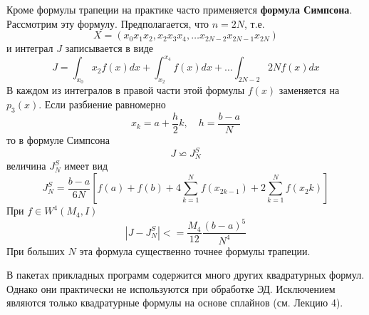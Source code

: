 Кроме формулы трапеции на практике часто применяется \textbf{формула Симпсона}. Рассмотрим эту формулу. Предполагается, что $n=2N$, т.е.
\begin{equation}
	X = (x_0 x_1 x_2, x_2 x_3 x_4, \dots x_{2N-2}x_{2N-1}x_{2N})
\end{equation}
и интеграл $J$ записывается в виде
\begin{equation}
	J=\int_{x_0}{x_2}f(x)dx + \int_{x_2}^{x_4}f(x)dx + \dots \int_{2N-2}{2N}f(x)dx
\end{equation}
В каждом из интегралов в правой части этой формулы $f(x)$ заменяется на $p_3(x)$. Если разбиение равномерно
\begin{equation}
	x_k = a + \frac{h}{2}k, \quad h=\frac{b-a}{N}
\end{equation}
то в формуле Симпсона
\begin{equation}
	J \backsimeq J_N^S
\end{equation}
величина $J_N^S$ имеет вид
\begin{equation}
	J_N^S = \frac{b-a}{6N}[f(a) + f(b) + 4\sum_{k=1}^{N}f(x_{2k-1}) + 2\sum_{k=1}^{N}f(x_2k)]
\end{equation}
При $f \in W^4(M_4,I)$
\begin{equation}
	|J-J^S_N| <= \frac{M_4}{12}\frac{(b-a)^5}{N^4}
\end{equation}
При больших $N$ эта формула существенно точнее формулы трапеции.

В пакетах прикладных программ содержится много других квадратурных формул. Однако они практически не используются при обработке ЭД. Исключением являются только квадратурные формулы на основе сплайнов (см. Лекцию 4).